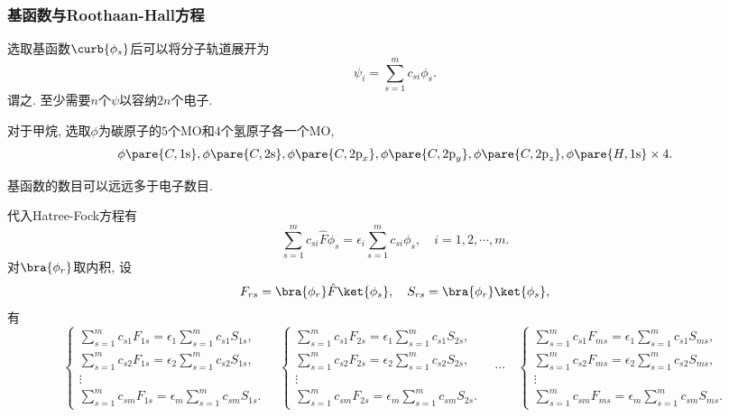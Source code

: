 \documentclass[hidelinks]{ctexart}
\begin{document}

\subsubsection{基函数与Roothaan-Hall方程} %
\label{ssub:基函数与roothaan_hall方程}

选取基函数$\curb{\phi_s}$后可以将分子轨道展开为
\[ \psi_i = \sum_{s=1}^m c_{si}\phi_s. \]
谓之. 至少需要$n$个$\psi$以容纳$2n$个电子.
\begin{ex}
    对于甲烷, 选取$\phi$为碳原子的$5$个MO和$4$个氢原子各一个MO,
    \[ \phi\pare{C,\mathrm{1s}},\phi\pare{C,\mathrm{2s}},\phi\pare{C,\mathrm{2p}_x},\phi\pare{C,\mathrm{2p}_y},\phi\pare{C,\mathrm{2p}_z},\phi\pare{H,\mathrm{1s}}\times 4. \]
\end{ex}
\begin{remark}
    基函数的数目可以远远多于电子数目.
\end{remark}
代入Hatree-Fock方程有
\[ \sum_{s=1}^m c_{si}\hat F\phi_{s} = \epsilon_i \sum_{s=1}^m c_{si}\phi_s,\quad i = 1,2,\cdots,m. \]
对$\bra{\phi_r}$取内积, 设
\[ F_{rs} = \bra{\phi_r}\hat F\ket{\phi_s},\quad S_{rs} = \bra{\phi_r}\ket{\phi_s}, \]
有
\[ \begin{cases}
    \displaystyle \sum_{s=1}^m c_{s1}F_{1s} = \epsilon_1 \sum_{s=1}^m c_{s1}S_{1s}, \\
    \displaystyle \sum_{s=1}^m c_{s2}F_{1s} = \epsilon_2 \sum_{s=1}^m c_{s2}S_{1s},\\
    \vdots \\
    \displaystyle \sum_{s=1}^m c_{sm}F_{1s} = \epsilon_m \sum_{s=1}^m c_{sm}S_{1s}.
\end{cases}\quad \begin{cases}
    \displaystyle \sum_{s=1}^m c_{s1}F_{2s} = \epsilon_1 \sum_{s=1}^m c_{s1}S_{2s}, \\
    \displaystyle \sum_{s=1}^m c_{s2}F_{2s} = \epsilon_2 \sum_{s=1}^m c_{s2}S_{2s},\\
    \vdots \\
    \displaystyle \sum_{s=1}^m c_{sm}F_{2s} = \epsilon_m \sum_{s=1}^m c_{sm}S_{2s}.
\end{cases}\quad \cdots \quad  \begin{cases}
    \displaystyle \sum_{s=1}^m c_{s1}F_{ms} = \epsilon_1 \sum_{s=1}^m c_{s1}S_{ms}, \\
    \displaystyle \sum_{s=1}^m c_{s2}F_{ms} = \epsilon_2 \sum_{s=1}^m c_{s2}S_{ms},\\
    \vdots \\
    \displaystyle \sum_{s=1}^m c_{sm}F_{ms} = \epsilon_m \sum_{s=1}^m c_{sm}S_{ms}.
\end{cases} \]
\end{document}
